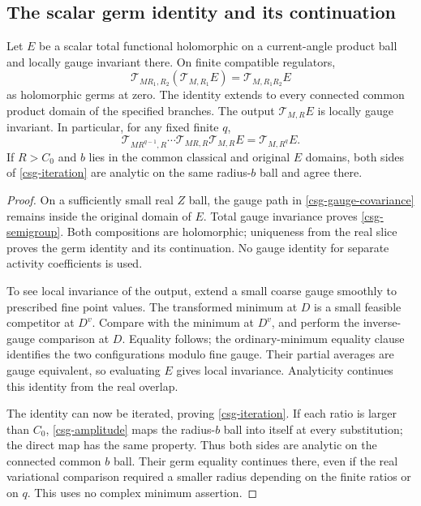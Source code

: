 \subsection{The scalar germ identity and its continuation}
\label{csg-identity-section}

\begin{theorem}
\label{csg-theorem}
Let $E$ be a scalar total functional holomorphic on a
current-angle product ball and locally gauge invariant
there. On finite compatible regulators,
\begin{equation}
 \mathcal T_{MR_1,R_2}(\mathcal T_{M,R_1}E)
                   =\mathcal T_{M,R_1R_2}E
 \label{csg-semigroup}
\end{equation}
as holomorphic germs at zero. The identity extends to every
connected common product domain of the specified branches.
The output $\mathcal T_{M,R}E$ is locally gauge invariant.
In particular, for any fixed finite $q$,
\begin{equation}
 \mathcal T_{MR^{q-1},R}\cdots
 \mathcal T_{MR,R}\mathcal T_{M,R}E
                         =\mathcal T_{M,R^q}E.
 \label{csg-iteration}
\end{equation}
If $R>C_0$ and $b$ lies in the common classical and original
$E$ domains, both sides of \eqref{csg-iteration} are
analytic on the same radius-$b$ ball and agree there.
\end{theorem}
\begin{proof}
On a sufficiently small real $Z$ ball, the gauge path in
\eqref{csg-gauge-covariance} remains inside the original
domain of $E$. Total gauge invariance proves
\eqref{csg-semigroup}. Both compositions are holomorphic;
uniqueness from the real slice proves the germ identity
and its continuation. No gauge identity for separate
activity coefficients is used.

To see local invariance of the output, extend a small
coarse gauge smoothly to prescribed fine point values.
The transformed minimum at $D$ is a small feasible
competitor at $D^v$. Compare with the minimum at $D^v$,
and perform the inverse-gauge comparison at $D$.
Equality follows; the ordinary-minimum equality clause
identifies the two configurations modulo fine gauge.
Their partial averages are gauge equivalent, so evaluating
$E$ gives local invariance. Analyticity continues this
identity from the real overlap.

The identity can now be iterated, proving
\eqref{csg-iteration}. If each ratio is larger than $C_0$,
\eqref{csg-amplitude} maps the radius-$b$ ball into itself
at every substitution; the direct map has the same
property. Thus both sides are analytic on the connected
common $b$ ball. Their germ equality continues there,
even if the real variational comparison required a
smaller radius depending on the finite ratios or on $q$.
This uses no complex minimum assertion.
\end{proof}

